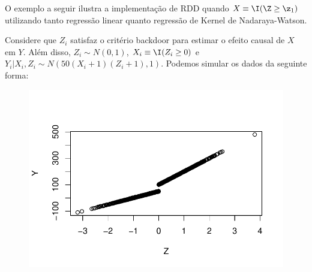 O exemplo a seguir ilustra a implementação de RDD quando
$X \equiv \I(\Z \geq \z_1)$ utilizando 
tanto regressão linear quanto 
regressão de Kernel de Nadaraya-Watson.

\begin{example}
 \label{ex:rdd}
 Considere que $Z_i$ satisfaz 
 o critério backdoor para estimar 
 o efeito causal de $X$ em $Y$.
 Além disso, $Z_i \sim N(0,1)$,
 $X_i \equiv \I(Z_i \geq 0)$ e
 $Y_i|X_i,Z_i \sim N(50(X_i+1)(Z_i + 1), 1)$.
 Podemos simular os dados da seguinte forma:
 
\begin{knitrout}
\color{fgcolor}\begin{kframe}
\begin{alltt}
 \hlkwb{<-} 
 \hlkwb{<-} 
 \hlkwb{<-}  \hlopt{>=} 
 \hlkwb{<-}  \hlopt{*}\hlopt{+}\hlstd{)}\hlopt{*}\hlopt{+}\hlstd{))}
 \hlkwb{<-} 
\end{alltt}


{\ttfamily\noindent\bfseries{}}\begin{alltt}
\end{alltt}
\end{kframe}\begin{figure}[t]

{\centering \includegraphics[width=\maxwidth]{figure/rdd_ex_1_1-1} 

}
\end{figure}
\end{knitrout}
\end{example}
